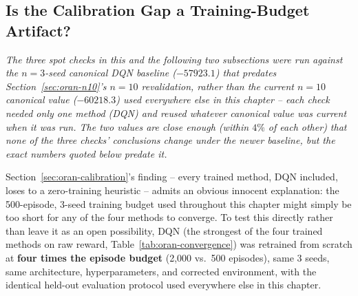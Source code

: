 

\subsection{Is the Calibration Gap a Training-Budget Artifact?}
\label{sec:oran-training-budget-check}

\textit{The three spot checks in this and the following two subsections
were run against the $n=3$-seed canonical DQN baseline
($-57923.1$) that predates Section~\ref{sec:oran-n10}'s $n=10$
revalidation, rather than the current $n=10$ canonical value
($-60218.3$) used everywhere else in this chapter -- each check needed
only one method (DQN) and reused whatever canonical value was current
when it was run. The two values are close enough (within $4\%$ of each
other) that none of the three checks' conclusions change under the
newer baseline, but the exact numbers quoted below predate it.}

Section~\ref{sec:oran-calibration}'s finding -- every trained method, DQN
included, loses to a zero-training heuristic -- admits an obvious
innocent explanation: the 500-episode, 3-seed training budget used
throughout this chapter might simply be too short for any of the four
methods to converge. To test this directly rather than leave it as an
open possibility, DQN (the strongest of the four trained methods on raw
reward, Table~\ref{tab:oran-convergence}) was retrained from scratch at
\textbf{four times the episode budget} (2{,}000 vs.\ 500 episodes), same
3 seeds, same architecture, hyperparameters, and corrected environment,
with the identical held-out evaluation protocol used everywhere else in
this chapter.

\begin{table}[htbp]
\centering
\caption{DQN at $4\times$ the training budget vs.\ the canonical
  500-episode run, against the heuristic and oracle reference policies.}
\label{tab:oran-training-budget-check}
\end{table}

